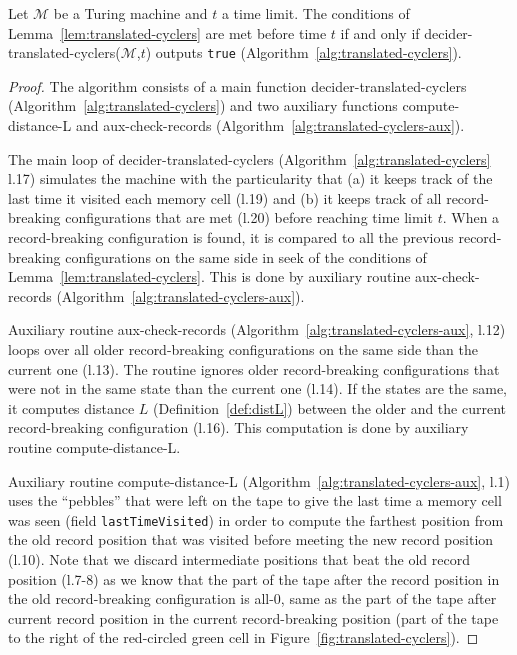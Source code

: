 \begin{theorem}\label{th:translated-cyclers}
  Let $\mathcal{M}$ be a Turing machine and $t$ a time limit. The conditions of Lemma~\ref{lem:translated-cyclers} are met before time $t$ if and only if {\sc decider-translated-cyclers}($\mathcal{M}$,$t$) outputs \texttt{true} (Algorithm~\ref{alg:translated-cyclers}).
\end{theorem}
\begin{proof}
  The algorithm consists of a main function {\sc decider-translated-cyclers} (Algorithm~\ref{alg:translated-cyclers}) and two auxiliary functions {\sc compute-distance-L} and {\sc aux-check-records} (Algorithm~\ref{alg:translated-cyclers-aux}).

  The main loop of {\sc decider-translated-cyclers} (Algorithm~\ref{alg:translated-cyclers} l.17) simulates the machine with the particularity that (a) it keeps track of the last time it visited each memory cell (l.19) and (b) it keeps track of all record-breaking configurations that are met (l.20) before reaching time limit $t$. When a record-breaking configuration is found, it is compared to all the previous record-breaking configurations on the same side in seek of the conditions of Lemma~\ref{lem:translated-cyclers}. This is done by auxiliary routine {\sc aux-check-records} (Algorithm~\ref{alg:translated-cyclers-aux}).

  Auxiliary routine {\sc aux-check-records} (Algorithm~\ref{alg:translated-cyclers-aux}, l.12) loops over all older record-breaking configurations on the same side than the current one (l.13). The routine ignores older record-breaking configurations that were not in the same state than the current one (l.14). If the states are the same, it computes distance $L$ (Definition~\ref{def:distL}) between the older and the current record-breaking configuration (l.16). This computation is done by auxiliary routine {\sc compute-distance-L}.

  Auxiliary routine {\sc compute-distance-L} (Algorithm~\ref{alg:translated-cyclers-aux}, l.1) uses the ``pebbles'' that were left on the tape to give the last time a memory cell was seen (field \texttt{lastTimeVisited}) in order to compute the farthest position from the old record position that was visited before meeting the new record position (l.10). Note that we discard intermediate positions that beat the old record position (l.7-8) as we know that the part of the tape after the record position in the old record-breaking configuration is all-0, same as the part of the tape after current record position in the current record-breaking position (part of the tape to the right of the red-circled green cell in Figure~\ref{fig:translated-cyclers}).


\end{proof}
